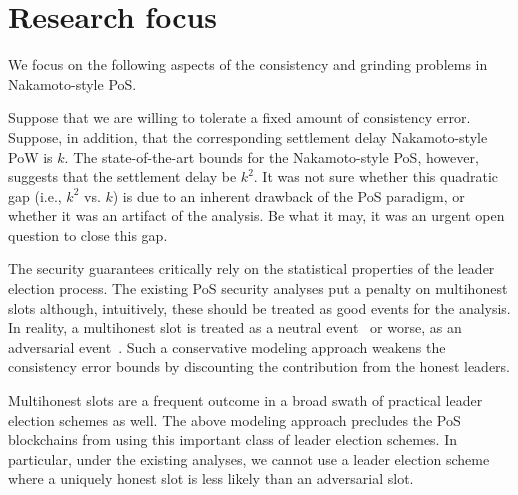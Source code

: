 \section{Research focus}\label{sec:intro-focus}
We focus on the following aspects of the consistency and grinding problems in 
Nakamoto-style PoS. 

Suppose that we are willing to tolerate a fixed amount of consistency error. 
Suppose, in addition, that the corresponding settlement delay Nakamoto-style PoW is $k$.
The state-of-the-art bounds for the Nakamoto-style PoS, however, 
suggests that the settlement delay be $k^2$. 
It was not sure whether this quadratic gap (i.e., $k^2$ vs. $k$)
is due to an inherent drawback of the PoS paradigm, 
or whether it was an artifact of the analysis. 
Be what it may, 
it was an urgent open question to close this gap. 


The security guarantees critically rely on the 
statistical properties of the leader election process. 
The existing PoS security analyses put a penalty on multihonest slots although, intuitively, 
these should be treated as good events for the analysis. 
In reality, a multihonest slot is treated as a neutral event~\cite{SnowWhite,Sleepy} 
or worse, as an adversarial event~\cite{Ouroboros,Praos,Genesis}. 
Such a conservative modeling approach weakens the consistency error bounds 
by discounting the contribution from the honest leaders. 

Multihonest slots are a frequent outcome 
in a broad swath of practical leader election schemes as well. 
The above modeling approach precludes the PoS blockchains 
from using this important class of leader election schemes. 
In particular, under the existing analyses, 
we cannot use a leader election scheme 
where a uniquely honest slot is less likely than an adversarial slot.


